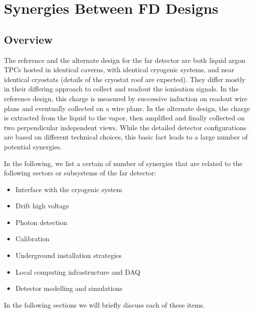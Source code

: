 \chapter{Synergies Between FD Designs}
\label{ch:detectors-synergy}

\section{Overview}

The reference and the alternate design for the far detector are both liquid argon TPCs hosted in identical caverns, with identical cryogenic systems, and near identical cryostats (details of the cryostat roof are expected). They differ mostly in their differing approach to collect and readout the ionisation signals. In the reference design, this charge is measured by successive induction on readout wire plans and eventually collected on a wire plane. In the alternate design, the charge is extracted from the liquid to the vapor, then amplified and finally collected on two perpendicular independent views. While the detailed detector configurations are based on different technical choices, this basic fact leads to a large number of potential synergies. 

In the following, we list a certain of number of synergies that are related to the following sectors or subsystems of the far detector:
 
\begin{itemize}

\item Interface with the cryogenic system

\item Drift high voltage 

\item Photon detection

\item Calibration

\item Underground installation strategies

\item Local computing infrastructure and DAQ

\item Detector modelling and simulations

\end{itemize}

In the following sections we will briefly discuss each of these items. 
  


